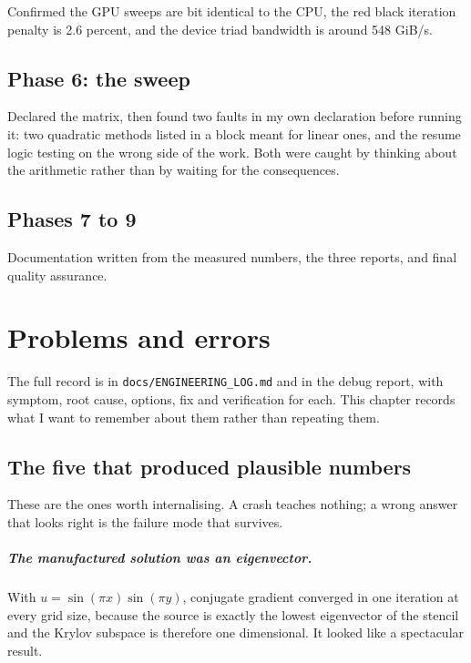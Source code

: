 \documentclass[11pt,a4paper]{report}
\begin{document}
Confirmed the GPU sweeps are bit identical to the CPU, the red black iteration
penalty is 2.6 percent, and the device triad bandwidth is around 548 GiB/s.

\section{Phase 6: the sweep}

Declared the matrix, then found two faults in my own declaration before running
it: two quadratic methods listed in a block meant for linear ones, and the resume
logic testing on the wrong side of the work. Both were caught by thinking about
the arithmetic rather than by waiting for the consequences.

\section{Phases 7 to 9}

Documentation written from the measured numbers, the three reports, and final
quality assurance.

\chapter{Problems and errors}

The full record is in \texttt{docs/ENGINEERING\_LOG.md} and in the debug report,
with symptom, root cause, options, fix and verification for each. This chapter
records what I want to remember about them rather than repeating them.

\section{The five that produced plausible numbers}

These are the ones worth internalising. A crash teaches nothing; a wrong answer
that looks right is the failure mode that survives.

\paragraph{The manufactured solution was an eigenvector.} With
$u = \sin(\pi x)\sin(\pi y)$, conjugate gradient converged in one iteration at
every grid size, because the source is exactly the lowest eigenvector of the
stencil and the Krylov subspace is therefore one dimensional. It looked like a
spectacular result.
\end{document}
